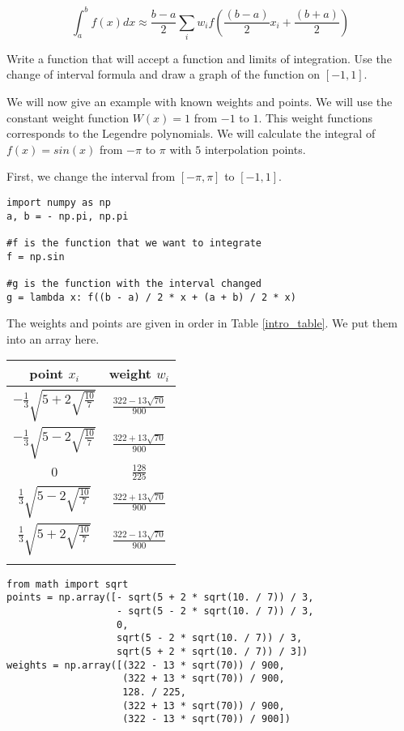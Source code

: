 \[
\int_a^b f(x) dx \approx \frac{b - a}{2} \sum_i w_if(\frac{(b-a)}{2}x_i + \frac{(b+a)}{2})
\]

\begin{problem}
Write a function that will accept a function and limits of integration.  Use the change of interval formula and draw a graph of the function on $[-1,1]$.
\end{problem}

We will now give an example with known weights and points.  We will use the constant weight function $W(x) = 1$ from $-1$ to $1$.  This weight functions corresponds to the Legendre polynomials.  We will calculate the integral of $f(x) = sin(x)$ from $-\pi$ to $\pi$ with $5$ interpolation points.

First, we change the interval from $[-\pi, \pi]$ to $[-1,1]$.

\begin{lstlisting}
import numpy as np
a, b = - np.pi, np.pi

#f is the function that we want to integrate
f = np.sin

#g is the function with the interval changed
g = lambda x: f((b - a) / 2 * x + (a + b) / 2 * x)
\end{lstlisting}

The weights and points are given in order in Table \ref{intro_table}.  We put them into an array here.
\begin{center}
\begin{tabular}{|c|c|}
\hline
point $x_i$ & weight $w_i$ \\
\hline
$-\frac{1}{3}\sqrt{5 + 2\sqrt{\frac{10}{7}}}$ &  $\frac{322-13\sqrt{70}}{900}$ \\
\hline
$-\frac{1}{3}\sqrt{5 - 2\sqrt{\frac{10}{7}}}$ & $\frac{322+13\sqrt{70}}{900}$ \\
\hline
$0$ & $\frac{128}{225}$ \\
\hline
$\frac{1}{3}\sqrt{5 - 2\sqrt{\frac{10}{7}}}$ & $\frac{322+13\sqrt{70}}{900}$ \\
\hline
$\frac{1}{3}\sqrt{5 + 2\sqrt{\frac{10}{7}}}$ & $\frac{322-13\sqrt{70}}{900}$ \\
\hline
\label{intro_table}
\end{tabular}
\end{center}
\begin{lstlisting}
from math import sqrt
points = np.array([- sqrt(5 + 2 * sqrt(10. / 7)) / 3,
                   - sqrt(5 - 2 * sqrt(10. / 7)) / 3,
                   0,
                   sqrt(5 - 2 * sqrt(10. / 7)) / 3,
                   sqrt(5 + 2 * sqrt(10. / 7)) / 3])
weights = np.array([(322 - 13 * sqrt(70)) / 900,
                    (322 + 13 * sqrt(70)) / 900,
                    128. / 225,
                    (322 + 13 * sqrt(70)) / 900,
                    (322 - 13 * sqrt(70)) / 900])
\end{lstlisting}

